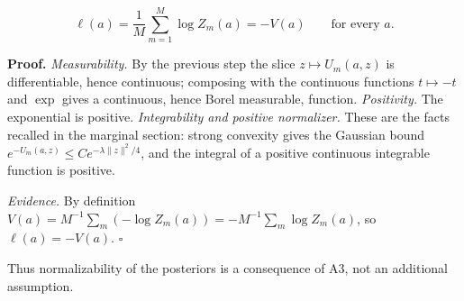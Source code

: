 \documentclass[11pt,a4paper]{report}
\begin{document}
\[\ell(a)=\frac1M\sum_{m=1}^M\log Z_m(a)=-V(a)\qquad\text{for every }a.\]


\textbf{Proof.} \emph{Measurability.} By the previous step the slice \(z\mapsto U_m(a,z)\) is differentiable, hence continuous; composing with the continuous functions \(t\mapsto-t\) and \(\exp\) gives a continuous, hence Borel measurable, function. \emph{Positivity.} The exponential is positive. \emph{Integrability and positive normalizer.} These are the facts recalled in the marginal section: strong convexity gives the Gaussian bound \(e^{-U_m(a,z)}\le Ce^{-\lambda\|z\|^2/4}\), and the integral of a positive continuous integrable function is positive.




\emph{Evidence.} By definition \(V(a)=M^{-1}\sum_m(-\log Z_m(a))=-M^{-1}\sum_m\log Z_m(a)\), so \(\ell(a)=-V(a)\). \(\square\)




Thus normalizability of the posteriors is a consequence of A3, not an additional assumption.
\end{document}
